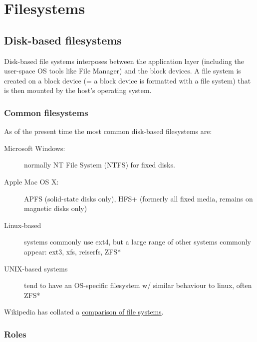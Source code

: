\chapter{Filesystems}

\section{Disk-based filesystems}\label{disk-based-filesystems}

Disk-based file systems interposes between the application layer
(including the user-space OS tools like File Manager) and the block
devices. A file system is created on a block device (= a block device is
formatted with a file system) that is then mounted by the host's
operating system.

\subsection{Common filesystems}\label{common-filesystems}

As of the present time the most common disk-based filesystems are:

\begin{description}
\item[Microsoft Windows:]
normally NT File System (NTFS) for fixed disks.
\item[Apple Mac OS X:]
APFS (solid-state disks only), HFS+ (formerly all fixed media, remains
on magnetic disks only)
\item[Linux-based]
systems commonly use ext4, but a large range of other systems commonly
appear: ext3, xfs, reiserfs, ZFS*
\item[UNIX-based systems]
tend to have an OS-specific filesystem w/ similar behaviour to linux,
often ZFS*
\end{description}

Wikipedia has collated a
\href{https://en.wikipedia.org/wiki/Comparison_of_file_systems}{comparison
of file systems}.

\subsection{Roles}\label{roles}

